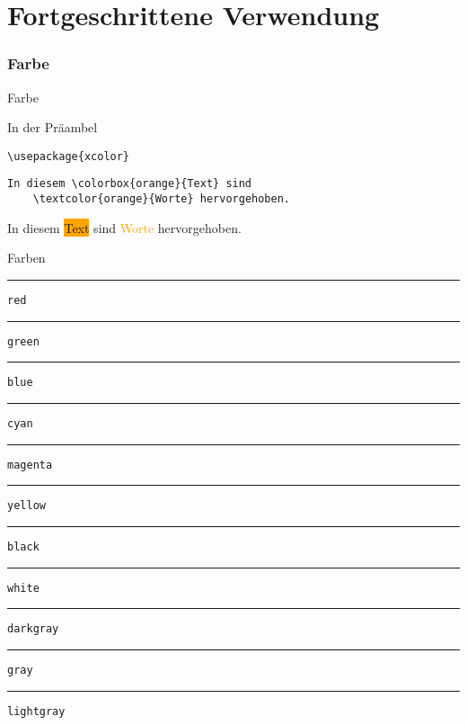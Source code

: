 \malte

\chapter{Fortgeschrittene Verwendung}


\website


\subsection{Farbe}

\begin{Frame}[fragile]{Farbe}
  \begin{Block}{In der Präambel}
    \begin{lstlisting}[gobble=6,style=block]
      \usepackage{xcolor}
    \end{lstlisting}
  \end{Block}

  \xxx

  \begin{lstlisting}[gobble=4]
    In diesem \colorbox{orange}{Text} sind
    \textcolor{orange}{Worte} hervorgehoben.
  \end{lstlisting}

  In diesem \colorbox{orange}{Text} sind
  \textcolor{orange}{Worte} hervorgehoben.
\end{Frame}

\newcommand{\colorsample}[1]{\textcolor{#1}{\rule[-.5ex]{2em}{2ex}} \texttt{#1}}

\begin{Frame}{Farben}
  \colorsample{red}\newline
  \colorsample{green}\newline
  \colorsample{blue}\newline
  \colorsample{cyan}\newline
  \colorsample{magenta}\newline
  \colorsample{yellow}

  \xxx

  \colorsample{black}\newline
  \colorsample{white}\newline
  \colorsample{darkgray}\newline
  \colorsample{gray}\newline
  \colorsample{lightgray}
\end{Frame}

